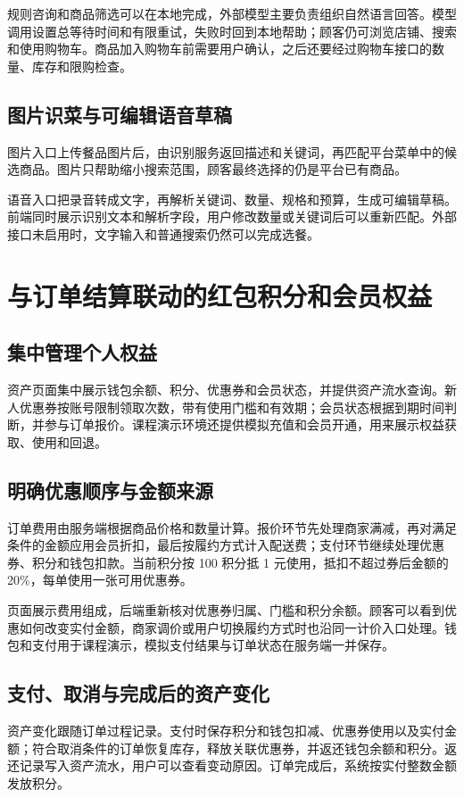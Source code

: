 规则咨询和商品筛选可以在本地完成，外部模型主要负责组织自然语言回答。模型调用设置总等待时间和有限重试，失败时回到本地帮助；顾客仍可浏览店铺、搜索和使用购物车。商品加入购物车前需要用户确认，之后还要经过购物车接口的数量、库存和限购检查。

\subsection{图片识菜与可编辑语音草稿}
图片入口上传餐品图片后，由识别服务返回描述和关键词，再匹配平台菜单中的候选商品。图片只帮助缩小搜索范围，顾客最终选择的仍是平台已有商品。

语音入口把录音转成文字，再解析关键词、数量、规格和预算，生成可编辑草稿。前端同时展示识别文本和解析字段，用户修改数量或关键词后可以重新匹配。外部接口未启用时，文字输入和普通搜索仍然可以完成选餐。

\section{与订单结算联动的红包积分和会员权益}
\subsection{集中管理个人权益}
资产页面集中展示钱包余额、积分、优惠券和会员状态，并提供资产流水查询。新人优惠券按账号限制领取次数，带有使用门槛和有效期；会员状态根据到期时间判断，并参与订单报价。课程演示环境还提供模拟充值和会员开通，用来展示权益获取、使用和回退。

\subsection{明确优惠顺序与金额来源}
订单费用由服务端根据商品价格和数量计算。报价环节先处理商家满减，再对满足条件的金额应用会员折扣，最后按履约方式计入配送费；支付环节继续处理优惠券、积分和钱包扣款。当前积分按 100 积分抵 1 元使用，抵扣不超过券后金额的 20\%，每单使用一张可用优惠券。

页面展示费用组成，后端重新核对优惠券归属、门槛和积分余额。顾客可以看到优惠如何改变实付金额，商家调价或用户切换履约方式时也沿同一计价入口处理。钱包和支付用于课程演示，模拟支付结果与订单状态在服务端一并保存。

\subsection{支付、取消与完成后的资产变化}
资产变化跟随订单过程记录。支付时保存积分和钱包扣减、优惠券使用以及实付金额；符合取消条件的订单恢复库存，释放关联优惠券，并返还钱包余额和积分。返还记录写入资产流水，用户可以查看变动原因。订单完成后，系统按实付整数金额发放积分。

